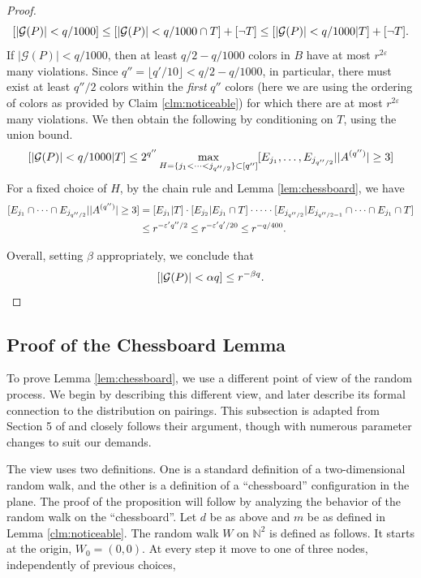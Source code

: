 \documentclass[10pt,a4paper]{article}
\theoremstyle{definition}%
\theoremstyle{plain}
\let\Pr\relax
\DeclareMathOperator*{\Pr}{\mathbb{P}}
\newcommand{\N}{\mathbb N}
\newcommand{\eps}{\varepsilon}
\newcommand{\calG}{\mathcal{G}}
\begin{document}
\begin{proof}
\[
 \Pr[|\calG(P)| < q/1000] \leq \Pr[|\calG(P)|< q/1000 \cap T] + \Pr[\neg T]\leq \Pr[|\calG(P)|< q/1000 | T] + \Pr[\neg T].
\]
If $|\calG(P)| < q/1000$, then at least $q/2 - q/1000$ colors in $B$ have at most $r^{2\eps}$ many violations. Since $q'' = \lfloor q'/10\rfloor < q/2 - q/1000$, in particular, there must exist at least $q''/2$ colors within the \emph{first} $q''$ colors (here we are using the ordering of colors as provided by Claim \ref{clm:noticeable}) for which there are at most $r^{2\eps}$ many violations. We then obtain the following by conditioning on $T$, using the union bound.
\[
 \Pr[|\calG(P)|< q/1000 | T] \leq 2^{q''} \max_{H = \{j_1<\cdots< j_{q''/2}\} \subset [q'']} \Pr[E_{j_1},\ldots, E_{j_{q''/2}}||A^{(q'')}|\geq 3]
\]
For a fixed choice of $H$, by the chain rule and Lemma \ref{lem:chessboard}, we have
\begin{align*}
\Pr[E_{j_1}\cap \cdots \cap E_{j_{q''/2}}||A^{(q'')}|\geq 3] &= \Pr[E_{j_1}|T]\cdot \Pr[E_{j_2}|E_{j_1}\cap T]\cdot \cdots\cdot  \Pr[E_{j_{q''/2}}|E_{j_{q''/2 - 1}}\cap \cdots \cap E_{j_1} \cap T]\\ &\leq r^{-\eps' q''/2}\leq r^{-\eps' q'/20} \leq r^{-q/400}.
\end{align*}

Overall, setting $\beta$ appropriately, we conclude that 
\[
\Pr[|\calG(P)|< \alpha q] \leq r^{-\beta q}.
\]
\end{proof}

\subsection{Proof of the Chessboard Lemma}\label{subsec:chessboard}

To prove Lemma \ref{lem:chessboard}, we use a different point of view of the random process. We begin by describing this different view, and later describe its formal connection to the distribution on pairings. This subsection is adapted from Section 5 of \cite{DvirMPY12} and closely follows their argument, though with numerous parameter changes to suit our demands.

The view uses two definitions. One is a standard definition of a two-dimensional random
walk, and the other is a definition of a “chessboard” configuration in the plane. The proof of the
proposition will follow by analyzing the behavior of the random walk on the “chessboard”.
Let $d$ be as above and $m$ be as defined in Lemma \ref{clm:noticeable}. The random walk $W$ on $\N^2$
is defined as follows. It
starts at the origin, $W_0 = (0, 0)$. At every step it move to one of three nodes, independently of
previous choices,
\end{document}
